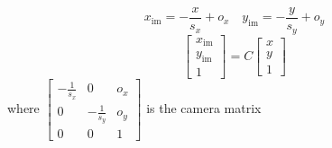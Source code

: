 \documentclass{article}
\begin{document}
\[x_\text{im} = -\frac{x}{s_x} + o_x \quad y_\text{im} = -\frac{y}{s_y} + o_y\]
\[\begin{bmatrix}
    x_\text{im} \\ y_\text{im} \\ 1
\end{bmatrix} = C \begin{bmatrix}
    x \\ y \\ 1
\end{bmatrix}\] where $\begin{bmatrix}
    -\frac{1}{s_x} & 0 & o_x \\
    0 & -\frac{1}{s_y} & o_y \\
    0 & 0 & 1
\end{bmatrix}$ is the camera matrix
\end{document}
